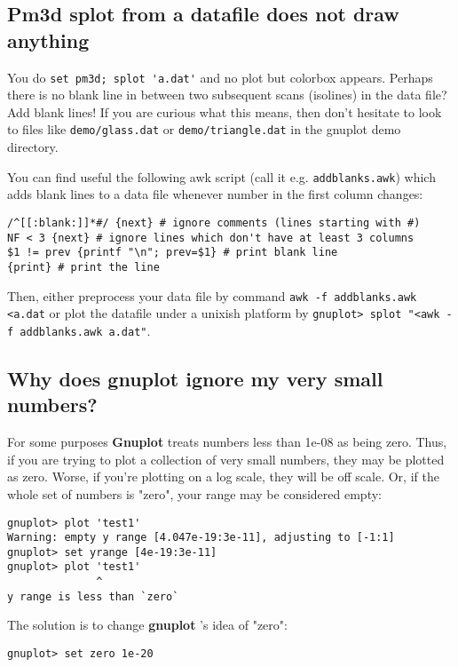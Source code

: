 \documentclass[a4paper,11pt]{article}
\newcommand{\gnuplot}{\textbf{gnuplot }}
\newcommand{\Gnuplot}{\textbf{Gnuplot }}
\begin{document}
\subsection{Pm3d splot from a datafile does not draw anything}
\label{blank1}

You do \verb+set pm3d; splot 'a.dat'+ and no plot but colorbox appears.
Perhaps there is no blank line in between two subsequent scans (isolines) in
the data file? Add blank lines! If you are curious what this means, then don't
hesitate to look to files like \verb+demo/glass.dat+ or \verb+demo/triangle.dat+
in the gnuplot demo directory.

You can find useful the following awk script (call it e.g. \verb+addblanks.awk+)
which adds blank lines to a data file whenever number in the first column
changes:
\small
\begin{verbatim}
/^[[:blank:]]*#/ {next} # ignore comments (lines starting with #)
NF < 3 {next} # ignore lines which don't have at least 3 columns
$1 != prev {printf "\n"; prev=$1} # print blank line
{print} # print the line
\end{verbatim}
\normalsize
Then, either preprocess your data file by command
\verb+awk -f addblanks.awk <a.dat+ or plot the datafile under a unixish platform
by \verb+gnuplot> splot "<awk -f addblanks.awk a.dat"+.

\subsection{Why does \gnuplot ignore my very small numbers?}

For some purposes \Gnuplot{} treats numbers less than 1e-08 as being zero.
Thus, if you are trying to plot a collection of very small
numbers, they may be plotted as zero. Worse, if you're plotting
on a log scale, they will be off scale. Or, if the whole set of
numbers is "zero", your range may be considered empty:

\small
\begin{verbatim}
gnuplot> plot 'test1'
Warning: empty y range [4.047e-19:3e-11], adjusting to [-1:1]
gnuplot> set yrange [4e-19:3e-11]
gnuplot> plot 'test1'
              ^
y range is less than `zero`
\end{verbatim}
\normalsize

The solution is to change \gnuplot's idea of "zero":
\small
\begin{verbatim}
gnuplot> set zero 1e-20
\end{verbatim}
\normalsize
\end{document}

